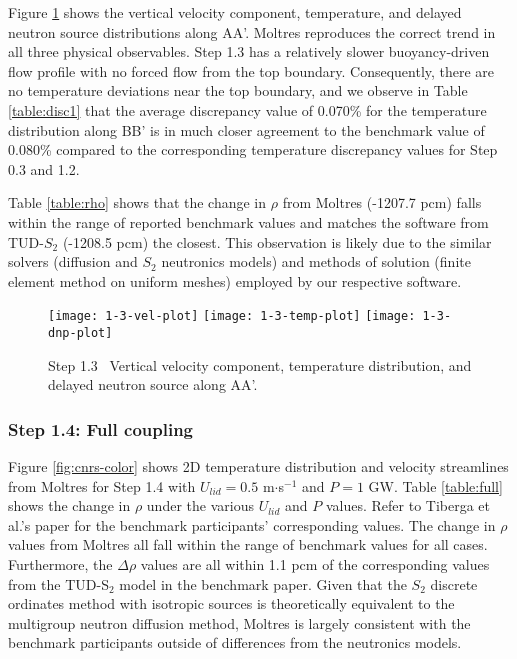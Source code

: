 Figure \ref{fig:1.3} shows the vertical velocity component, temperature, and
delayed neutron source distributions along AA'.
Moltres reproduces the correct trend in all three physical
observables. Step 1.3 has a relatively slower buoyancy-driven flow profile with
no forced flow from the top boundary. Consequently, there are no temperature
deviations near the top boundary, and we observe in Table \ref{table:disc1} that
the average discrepancy value of 0.070\% for the temperature distribution along
BB' is in much closer agreement to the benchmark value of 0.080\% compared to
the corresponding temperature discrepancy values for Step 0.3 and 1.2.

Table \ref{table:rho} shows that the change in $\rho$ from
Moltres (-1207.7 pcm) falls within the range of reported benchmark values and
matches the software from TUD-$S_2$ (-1208.5 pcm) the closest. This observation is likely
due to the similar solvers (diffusion and $S_2$ neutronics models) and
methods of solution (finite element method on uniform meshes) employed by our
respective software.
%
\begin{figure}[htb]
	\centering
	\texttt{[image: 1-3-vel-plot]}
	\texttt{[image: 1-3-temp-plot]}
	\texttt{[image: 1-3-dnp-plot]}
	\caption{Step 1.3 \textemdash\ Vertical velocity component, temperature distribution,
	and delayed neutron source along AA'.}
	\label{fig:1.3}
\end{figure}

\FloatBarrier

\subsubsection{Step 1.4: Full coupling}

Figure \ref{fig:cnrs-color} shows 2D temperature distribution and velocity
streamlines from Moltres for Step 1.4 with $U_{lid} = 0.5$ m$\cdot$s$^{-1}$ and
$P = 1$ GW. Table \ref{table:full} shows the change in $\rho$ under the various
$U_{lid}$ and $P$ values. Refer to Tiberga et al.'s paper
\cite{tiberga_results_2020} for the benchmark participants' corresponding
values. The change in $\rho$ values from Moltres all fall within the range of
benchmark values
for all cases. Furthermore, the $\Delta\rho$ values are all within 1.1 pcm of
the corresponding values from the TUD-S$_2$ model in the benchmark paper. Given
that the $S_2$ discrete ordinates method with isotropic sources is theoretically equivalent to the
multigroup neutron diffusion method, Moltres is largely
consistent with the benchmark participants outside of differences from the
neutronics models.

